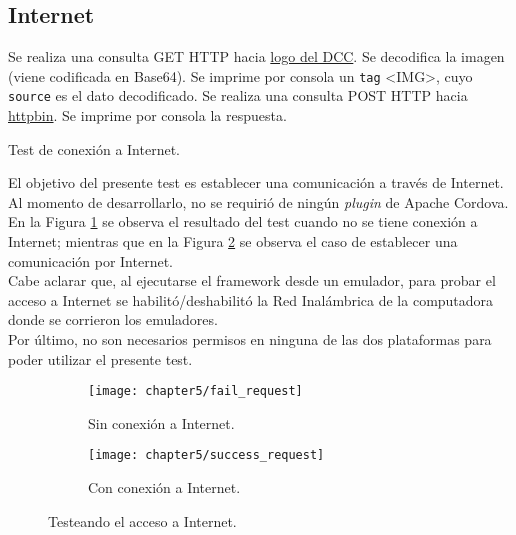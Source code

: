 \subsection{Internet}
\begin{algorithm}
	\begin{algorithmic}[1]
		\STATE Se realiza una consulta GET HTTP hacia \href{https://dcc.fceia.unr.edu.ar/sites/all/themes/birthofcool/images/logo-lcc.png}{logo del DCC}.
		\STATE Se decodifica la imagen (viene codificada en Base64).
		\STATE Se imprime por consola un \texttt{tag} \textless IMG\textgreater, cuyo \texttt{source} es el dato decodificado.
		\STATE Se realiza una consulta POST HTTP hacia \href{http://httpbin.org/post}{httpbin}.
		\STATE Se imprime por consola la respuesta.
	\end{algorithmic}
	\caption{Test de conexión a Internet.}\label{alg:chap5_test_internet}
\end{algorithm}
El objetivo del presente test es establecer una comunicación a través de Internet. Al momento de desarrollarlo, no se requirió de ningún \textit{plugin} de Apache Cordova.\\

En la Figura \ref{fig:ch05:fail_request} se observa el resultado del test cuando no se tiene conexión a Internet; mientras que en la Figura \ref{fig:ch05:success_request} se observa el caso de establecer una comunicación por Internet.\\

Cabe aclarar que, al ejecutarse el framework desde un emulador, para probar el acceso a Internet se habilitó/deshabilitó la Red Inalámbrica de la computadora donde se corrieron los emuladores.\\

Por último, no son necesarios permisos en ninguna de las dos plataformas para poder utilizar el presente test.
\begin{figure}[tp]
    \centering
    \begin{subfigure}{.35\linewidth}
		\texttt{[image: chapter5/fail\_request]}
		\caption{Sin conexión a Internet.}
		\label{fig:ch05:fail_request}
	\end{subfigure}
	\begin{subfigure}{.35\linewidth}
		\texttt{[image: chapter5/success\_request]}
		\caption{Con conexión a Internet.}
		\label{fig:ch05:success_request}
	\end{subfigure}
	\caption{Testeando el acceso a Internet.}
	\label{fig:ch05:internet_test}
\end{figure}
